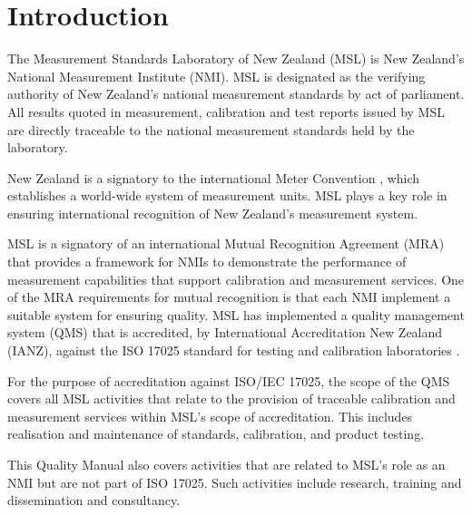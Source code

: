 \section{Introduction}
The Measurement Standards Laboratory of New Zealand (MSL) is New Zealand's National Measurement Institute (NMI). MSL is designated as the verifying authority of New Zealand's national measurement standards by act of parliament. All results quoted in measurement, calibration and test reports issued by MSL are directly traceable to the national measurement standards held by the laboratory. 

New Zealand is a signatory to the international Meter Convention \cite{Metre_convention}, which establishes a world-wide system of measurement units. 
MSL plays a key role in ensuring international recognition of New Zealand's measurement system. 

MSL is a signatory of an international Mutual Recognition Agreement (MRA) \cite{MRA_1999} that provides a framework for NMIs to demonstrate the performance of measurement capabilities that support calibration and measurement services. One of the MRA requirements for mutual recognition is that each NMI implement a suitable system for ensuring quality. MSL has implemented a quality management system (QMS) that is accredited, by International Accreditation New Zealand (IANZ), against the ISO 17025 standard for testing and calibration laboratories \cite{ISO_17025}. 

For the purpose of accreditation against ISO/IEC 17025, the scope of the QMS covers all MSL activities that relate to the provision of traceable calibration and measurement services within MSL's scope of accreditation.  This includes realisation and maintenance of standards, calibration, and product testing. 

This Quality Manual also covers activities that are related to MSL's role as an NMI but are not part of ISO 17025.  Such activities include research, training and dissemination and consultancy.